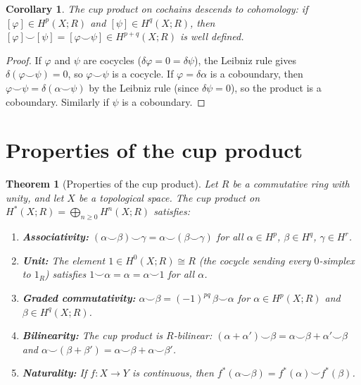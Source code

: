 \documentclass[12pt,a4paper,openany]{book}
\theoremstyle{definition}
\theoremstyle{plain}
\newtheorem{theorem}[definition]{Theorem}
\newtheorem{corollary}[definition]{Corollary}
\theoremstyle{remark}
\begin{document}
\begin{corollary}\label{cor:cup-cohomology}
The cup product on cochains descends to cohomology: if
$[\varphi]\in H^p(X;R)$ and $[\psi]\in H^q(X;R)$, then
$[\varphi]\smile[\psi] = [\varphi\smile\psi]\in H^{p+q}(X;R)$
is well defined.
\end{corollary}

\begin{proof}
If $\varphi$ and $\psi$ are cocycles ($\delta\varphi=0=\delta\psi$),
the Leibniz rule gives $\delta(\varphi\smile\psi)=0$, so
$\varphi\smile\psi$ is a cocycle. If $\varphi=\delta\alpha$ is a
coboundary, then $\varphi\smile\psi=\delta(\alpha\smile\psi)$ by
the Leibniz rule (since $\delta\psi=0$), so the product is a coboundary.
Similarly if $\psi$ is a coboundary.
\end{proof}

\section{Properties of the cup product}
\label{sec:cup-properties}

\begin{theorem}[Properties of the cup product]\label{thm:cup-properties}
Let $R$ be a commutative ring with unity, and let $X$ be a topological
space. The cup product on $H^*(X;R)=\bigoplus_{n\geq 0}H^n(X;R)$
satisfies:
\begin{enumerate}[label=(\roman*)]
  \item\label{it:cup-assoc}
    \textbf{Associativity:}
    $(\alpha\smile\beta)\smile\gamma = \alpha\smile(\beta\smile\gamma)$
    for all $\alpha\in H^p$, $\beta\in H^q$, $\gamma\in H^r$.

  \item\label{it:cup-unit}
    \textbf{Unit:}
    The element $1\in H^0(X;R)\cong R$ (the cocycle sending every
    $0$-simplex to $1_R$) satisfies
    $1\smile\alpha = \alpha = \alpha\smile 1$ for all $\alpha$.

  \item\label{it:cup-graded-comm}
    \textbf{Graded commutativity:}%
    $\alpha\smile\beta = (-1)^{pq}\,\beta\smile\alpha$
    for $\alpha\in H^p(X;R)$ and $\beta\in H^q(X;R)$.

  \item\label{it:cup-bilinear}
    \textbf{Bilinearity:}
    The cup product is $R$-bilinear:
    $(\alpha+\alpha')\smile\beta = \alpha\smile\beta+\alpha'\smile\beta$
    and $\alpha\smile(\beta+\beta')=\alpha\smile\beta+\alpha\smile\beta'$.

  \item\label{it:cup-naturality}
    \textbf{Naturality:}
    If $f\colon X\to Y$ is continuous, then
    $f^*(\alpha\smile\beta) = f^*(\alpha)\smile f^*(\beta)$.
\end{enumerate}
\end{theorem}
\end{document}
